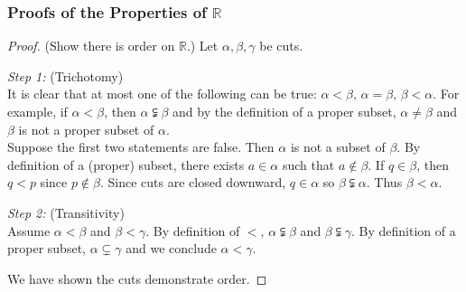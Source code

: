 \documentclass[../main.tex]{subfiles}
\begin{document}
\subsubsection{Proofs of the Properties of \( \mathbb{R} \)}

\begin{proof}[Proof]
    (Show there is order on \( \mathbb{R} \).)
    Let \( \alpha,\beta,\gamma \) be cuts.

    \emph{Step 1:} (Trichotomy) \\
    It is clear that at most one of the following can be true: \( \alpha < \beta, \, \alpha = \beta , \, \beta < \alpha \).
    For example, if \( \alpha < \beta \), then \( \alpha \subsetneqq \beta \)
    and by the definition of a proper subset, \( \alpha \neq \beta \) and \( \beta \) is not a proper subset of \( \alpha \). \\
    Suppose the first two statements are false. Then \( \alpha \) is not a subset of \( \beta \).
    By definition of a (proper) subset, there exists \( a \in \alpha \) such that \( a \notin \beta \).
    If \( q \in \beta \), then \( q < p \) since \( p \notin \beta \).
    Since cuts are closed downward, \( q \in \alpha \) so \( \beta \subsetneqq \alpha \). Thus \( \beta < \alpha \).

    \emph{Step 2:} (Transitivity) \\
    Assume \( \alpha < \beta \) and \( \beta < \gamma \).
    By definition of \( < \), \( \alpha \subsetneqq \beta \) and \( \beta \subsetneqq \gamma \).
    By definition of a proper subset, \( \alpha \subsetneq \gamma \) and we conclude \( \alpha < \gamma \). \checkmark

    We have shown the cuts demonstrate order.
\end{proof}
\end{document}
